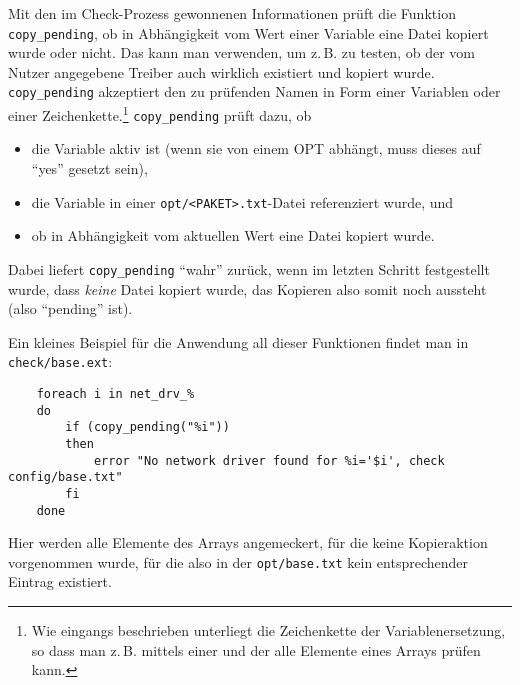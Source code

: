         Mit den im Check-Prozess gewonnenen Informationen prüft die
        Funktion \texttt{copy\_pending}, ob in Abhängigkeit vom Wert einer
        Variable eine Datei kopiert wurde oder nicht. Das kann man
        verwenden, um z.\,B. zu testen, ob der vom Nutzer angegebene
        Treiber auch wirklich existiert und kopiert
        wurde. \texttt{copy\_pending} akzeptiert den zu prüfenden Namen in Form
        einer Variablen oder einer Zeichenkette.\footnote{Wie eingangs
        beschrieben unterliegt die Zeichenkette der Variablenersetzung, so dass
        man z.\,B. mittels einer
         und der
         alle
        Elemente eines Arrays prüfen kann.} \texttt{copy\_pending} prüft dazu,
        ob

        \begin{itemize}
        \item die Variable aktiv ist (wenn sie von einem OPT abhängt,
           muss dieses auf "`yes"' gesetzt sein),

         \item die Variable in einer \texttt{opt/<PAKET>.txt}-Datei referenziert
           wurde, und

         \item ob in Abhängigkeit vom aktuellen Wert eine Datei kopiert
           wurde.
        \end{itemize}

        Dabei liefert \texttt{copy\_pending} "`wahr"' zurück, wenn im letzten
        Schritt festgestellt wurde, dass \emph{keine} Datei kopiert wurde,
        das Kopieren also somit noch aussteht (also "`pending"' ist).

    Ein kleines Beispiel für die Anwendung all dieser Funktionen
    findet man in \texttt{check/base.ext}:

\begin{example}
\begin{verbatim}
    foreach i in net_drv_%
    do
        if (copy_pending("%i"))
        then
            error "No network driver found for %i='$i', check config/base.txt"
        fi
    done
\end{verbatim}
\end{example}

    Hier werden alle Elemente des Arrays  angemeckert, für
    die keine Kopieraktion vorgenommen wurde, für die also in der
    \texttt{opt/base.txt} kein entsprechender Eintrag existiert.

